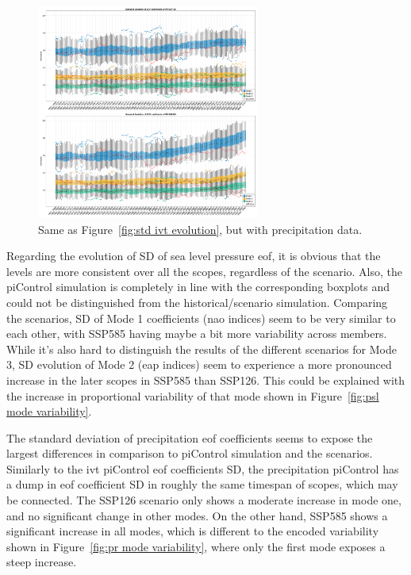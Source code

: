 \begin{figure}[htb]
  \begin{center}
    \includegraphics[width=0.65\textwidth]{figures/std_pr_50seasons_tempmodescale_3modes.png}
  \end{center}
  \caption{Same as Figure~\ref{fig:std ivt evolution}, but with precipitation data.}
  \label{fig:std pr evolution}
\end{figure}

Regarding the evolution of SD of sea level pressure \ac{eof}, it is obvious that the levels are more consistent over all the scopes, regardless of the scenario. 
Also, the piControl simulation is completely in line with the corresponding boxplots and could not be distinguished from the historical/scenario simulation. 
Comparing the scenarios, SD of Mode 1 coefficients (\ac{nao} indices) seem to be very similar to each other, with SSP585 having maybe a bit more variability across members. 
While it's also hard to distinguish the results of the different scenarios for Mode 3, SD evolution of Mode 2 (\ac{eap} indices) seem to experience a more pronounced increase in the later scopes in SSP585 than SSP126.  
This could be explained with the increase in proportional variability of that mode shown in Figure~\ref{fig:psl mode variability}.


The standard deviation of precipitation \ac{eof} coefficients seems to expose the largest differences in comparison to piControl simulation and the scenarios. 
Similarly to the \ac{ivt} piControl \ac{eof} coefficients SD, the precipitation piControl has a dump in \ac{eof} coefficient SD in roughly the same timespan of scopes, which may be connected. 
The SSP126 scenario only shows a moderate increase in mode one, and no significant change in other modes. 
On the other hand, SSP585 shows a significant increase in all modes, which is different to the encoded variability shown in Figure~\ref{fig:pr mode variability}, where only the first mode exposes a steep increase. 

